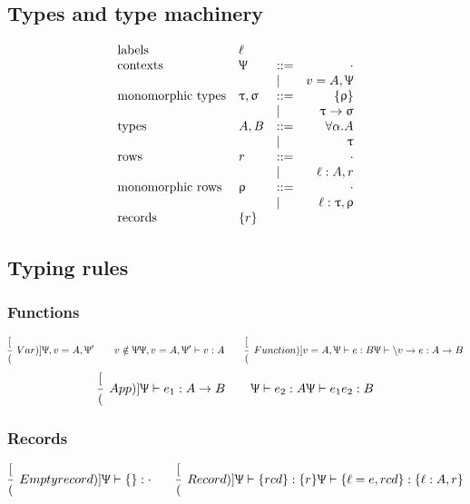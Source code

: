 \documentclass{article}
\newcommand{\define}{::=}
\newcommand{\arrow}{\to}
\newcommand{\rcd}[1]{\{#1\}}
\newcommand{\emptyrow}{\cdot}
\newcommand{\spc}{\qquad}
\newcommand{\declCtx}{\Uppsi}
\newcommand{\derives}[3]{#1 \vdash #2 : #3}
\newcommand{\lbl}{\ell}
\newcommand{\expr}{e}
\newcommand{\var}{v}
\newcommand{\row}{r}
\newcommand{\rowm}{\uprho}
\newcommand{\tp}{A}
\newcommand{\tpalt}{B}
\newcommand{\tpm}{\uptau}
\newcommand{\tpmalt}{\upsigma}
\newcommand{\tvar}{\alpha}
\newcommand{\deduct}[3][]
{
  \begin{prooftree}
    \hypo{#2}
    \infer1[\text{#1}]{#3}
  \end{prooftree}
}
\begin{document}
\subsection{Types and type machinery}

\[
  \begin{array}{lllrl}
    \text{labels} & \lbl & & \\
    \text{contexts} & \declCtx & \define & \cdot \\
    & & | & v = \tp, \declCtx \\
    \text{monomorphic types} & \tpm, \tpmalt & \define & \rcd \uprho  \\
    & & | & \tpm \arrow \tpmalt \\
    \text{types} & \tp, \tpalt & \define & \forall \tvar. \tp \\
    & & | & \tpm \\
    \text{rows} & \row & \define & \emptyrow  \\
    & & | & \lbl : \tp, \row \\
    \text{monomorphic rows} & \rowm & \define & \emptyrow  \\
    & & | & \lbl : \tpm, \rowm  \\
    \text{records} & \{\row\} & &
  \end{array}
\]

\subsection{Typing rules}

\subsubsection{Functions}
\[
  \deduct
  [(Var)]
  {\declCtx, \var = \tp, \declCtx' \spc \var \notin \declCtx}
  {\derives {\declCtx, \var = \tp, \declCtx'} \var \tp}
  \spc
  \deduct
  [(Function)]
  {\derives {\var = \tp, \declCtx} \expr \tpalt}
  {\derives \declCtx {\backslash \var \arrow \expr} { \tp
      \arrow \tpalt}}
\]
\[
  \deduct
  [(App)]
  {\derives \declCtx {\expr_1} {\tp \arrow \tpalt} \spc \derives \declCtx
    {\expr_2} {\tp}}
  {\derives \declCtx {\expr_1 \expr_2} \tpalt}
\]

\subsubsection{Records}
\[
  \deduct
  [(Empty record)]
  {}
  {\derives \declCtx {\rcd{}} \emptyrow}
  \spc
  \deduct
  [(Record)]
  {\derives \declCtx {\rcd {rcd}} {\rcd \row}}
  {\derives \declCtx {\rcd{\lbl=e,rcd}} {\rcd{\lbl : \tp, \row}}}
\]
\end{document}
